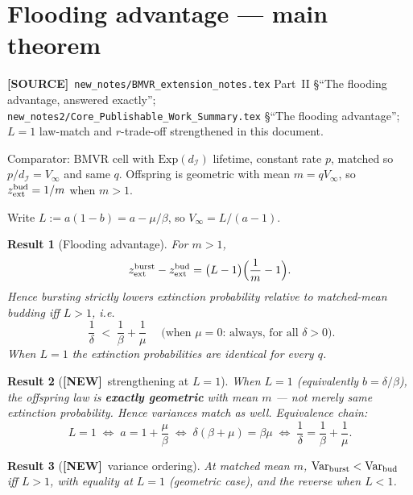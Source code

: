 \documentclass[11pt,a4paper]{article}
\newcommand{\Icell}{\mathcal{I}}
\theoremstyle{plain}
\newtheorem{result}{Result}[section]
\theoremstyle{definition}
\theoremstyle{remark}
\newcommand{\NEW}{\textcolor{blue!55!black}{\textbf{[NEW]}}}
\newcommand{\SOURCE}{\textcolor{gray!50!black}{\textbf{[SOURCE]}}}
\begin{document}
\section{Flooding advantage --- main theorem}
\label{sec:flooding}
\SOURCE\
\texttt{new\_notes/BMVR\_extension\_notes.tex}
Part~II \S``The flooding advantage, answered exactly'';
\texttt{new\_notes2/Core\_Publishable\_Work\_Summary.tex}
\S``The flooding advantage'';
$L=1$ law-match and $r$-trade-off strengthened in this document.

Comparator: BMVR cell with $\mathrm{Exp}(d_{\Icell})$ lifetime, constant rate
$p$, matched so $p/d_{\Icell}=V_\infty$ and same $q$. Offspring is geometric with
mean $m=q V_\infty$, so $z_{\rm ext}^{\rm bud}=1/m$ when $m>1$.

Write $L:=a(1-b)=a-\mu/\beta$, so $V_\infty=L/(a-1)$.

\begin{result}[Flooding advantage]
\label{res:flood}
For $m>1$,
\begin{equation}
\label{eq:flood}
z_{\rm ext}^{\rm burst}-z_{\rm ext}^{\rm bud}
=\bigl(L-1\bigr)\Bigl(\frac{1}{m}-1\Bigr).
\end{equation}
Hence bursting strictly lowers extinction probability relative to matched-mean
budding iff $L>1$, i.e.
\begin{equation}
\boxed{\;
\frac{1}{\delta}\;<\;\frac{1}{\beta}+\frac{1}{\mu}\;}
\quad
\bigl(\text{when }\mu=0\text{: always, for all }\delta>0\bigr).
\end{equation}
When $L=1$ the extinction probabilities are identical for every $q$.
\end{result}

\begin{result}[\NEW\ strengthening at $L=1$]
When $L=1$ (equivalently $b=\delta/\beta$), the offspring law is
\textbf{exactly geometric} with mean $m$ --- not merely same extinction
probability. Hence variances match as well.
Equivalence chain:
\[
L=1
\;\Longleftrightarrow\;
a=1+\frac{\mu}{\beta}
\;\Longleftrightarrow\;
\delta(\beta+\mu)=\beta\mu
\;\Longleftrightarrow\;
\frac{1}{\delta}=\frac{1}{\beta}+\frac{1}{\mu}.
\]
\end{result}

\begin{result}[\NEW\ variance ordering]
At matched mean $m$, $\mathrm{Var}_{\rm burst}<\mathrm{Var}_{\rm bud}$ iff
$L>1$, with equality at $L=1$ (geometric case), and the reverse when $L<1$.
\end{result}
\end{document}
